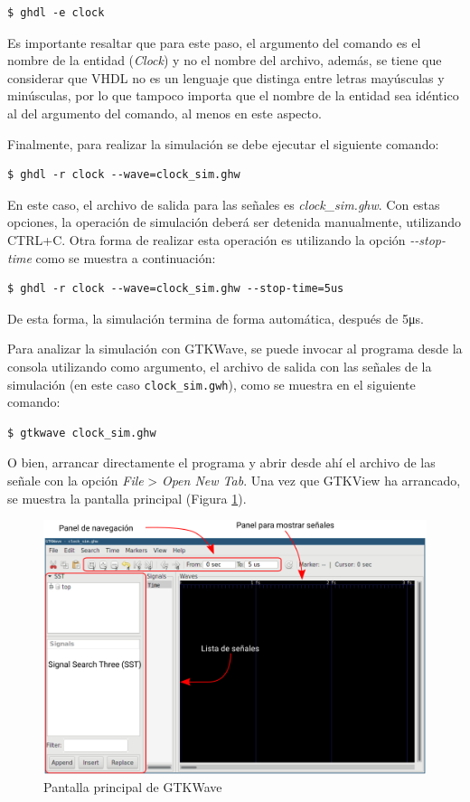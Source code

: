 \documentclass[11pt]{article}
\begin{document}
\begin{Verbatim}[frame=single]
$ ghdl -e clock
\end{Verbatim}

Es importante resaltar que para este paso, el argumento del comando es el
nombre de la entidad (\textit{Clock}) y no el nombre del archivo, además, se tiene que
considerar que VHDL no es un lenguaje que distinga entre letras mayúsculas y
minúsculas, por lo que tampoco importa que el nombre de la entidad sea idéntico
al del argumento del comando, al menos en este aspecto.

Finalmente, para realizar la simulación se debe ejecutar el siguiente comando:

\begin{Verbatim}[frame=single]
$ ghdl -r clock --wave=clock_sim.ghw
\end{Verbatim}

En este caso, el archivo de salida para las señales es \textit{clock\_sim.ghw}.
Con estas opciones, la operación de simulación deberá ser detenida manualmente,
utilizando CTRL+C. Otra forma de realizar esta operación es utilizando la
opción \textit{-{}-stop-time} como se muestra a continuación:

\begin{Verbatim}[frame=single]
$ ghdl -r clock --wave=clock_sim.ghw --stop-time=5us
\end{Verbatim}

De esta forma, la simulación termina de forma automática, después de
5\unit{\micro\second}.

Para analizar la simulación con GTKWave, se puede invocar al programa desde la
consola utilizando como argumento, el archivo de salida con las señales de la
simulación (en este caso \Verb*#clock_sim.gwh#), como se muestra en el siguiente
comando:

\begin{Verbatim}[frame=single]
$ gtkwave clock_sim.ghw
\end{Verbatim}

O bien, arrancar directamente el programa y abrir desde ahí el archivo de las
señale con la opción \textit{File} > \textit{Open New Tab}. Una vez que GTKView ha 
arrancado, se muestra la pantalla principal (Figura \ref{fig:gtkwave-1}).

\begin{figure}[H]
\centering
\includegraphics[width=.75\linewidth]{gtkwave-menu.png}
\caption{Pantalla principal de GTKWave}
\label{fig:gtkwave-1}
\end{figure}
\end{document}
